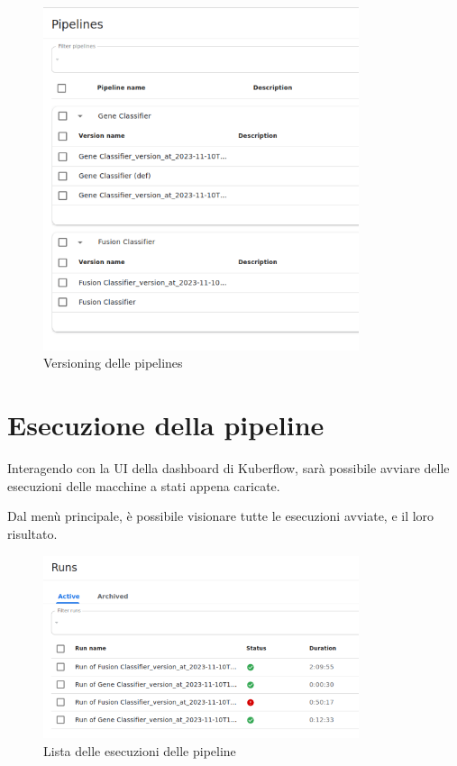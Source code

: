 \begin{figure}[h]
    \centering
    \includegraphics[width=350px]{figures/ch4and5/vers.png}
    \caption[Versioning delle pipelines]{Versioning delle pipelines}
    \label{fig:cha6:versions}
\end{figure}

\section{Esecuzione della pipeline}

Interagendo con la UI della dashboard di Kuberflow, sarà possibile avviare delle esecuzioni delle macchine a stati appena caricate. 

Dal menù principale, è possibile visionare tutte le esecuzioni avviate, e il loro risultato.

\begin{figure}[H]
    \centering
    \includegraphics[width=350px]{figures/ch4and5/runs.png}
    \caption[Lista delle esecuzioni delle pipeline]{Lista delle esecuzioni delle pipeline}
    \label{fig:cha6:runs}
\end{figure}

